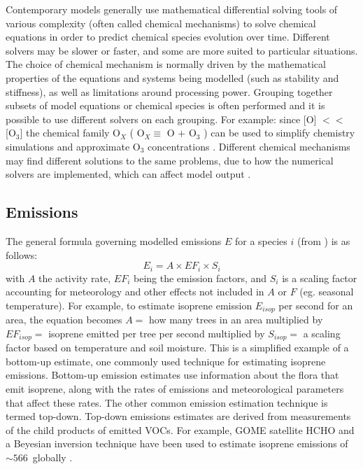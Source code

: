     Contemporary models generally use mathematical differential solving tools of various complexity (often called chemical mechanisms) to solve chemical equations in order to predict chemical species evolution over time.
    Different solvers may be slower or faster, and some are more suited to particular situations.
    The choice of chemical mechanism is normally driven by the mathematical properties of the equations and systems being modelled (such as stability and stiffness), as well as limitations around processing power.
    Grouping together subsets of model equations or chemical species is often performed and it is possible to use different solvers on each grouping.
    For example: since [O] $<<$ [O$_3$] the chemical family O$_X$ (  O$_X \equiv $ O $+$ O$_3$ ) can be used to simplify chemistry simulations and approximate O$_3$ concentrations \parencite[][Chapter 3]{BrasseurJacob2017}.
    Different chemical mechanisms may find different solutions to the same problems, due to how the numerical solvers are implemented, which can affect model output \parencite{Zhang2012}.
    
  \subsection{Emissions}
    \label{LR:Models:emissions}
    
    The general formula governing modelled emissions $E$ for a species $i$ (from \textcite{BrasseurJacob2017}) is as follows:
    \begin{equation}
      E_i = A \times EF_i \times S_i
    \end{equation}
    with $A$ the activity rate, $EF_i$ being the emission factors, and $S_i$ is a scaling factor accounting for meteorology and other effects not included in $A$ or $F$ (eg. seasonal temperature).
    For example, to estimate isoprene emission $E_{isop}$ per second for an area, the equation becomes $A=$ how many trees in an area multiplied by $EF_{isop}=$ isoprene emitted per tree per second multiplied by $S_{isop}=$ a scaling factor based on temperature and soil moisture.
    This is a simplified example of a bottom-up estimate, one commonly used technique for estimating isoprene emissions.
    Bottom-up emission estimates use information about the flora that emit isoprene, along with the rates of emissions and meteorological parameters that affect these rates.
    The other common emission estimation technique is termed top-down.
    Top-down emissions estimates are derived from measurements of the child 
    products of emitted VOCs.
    For example, GOME satellite HCHO and a Beyesian inversion technique have 
    been used to estimate isoprene emissions of $\sim566$\tgcpyr ~globally 
    \parencite{Shim2005}. 
    
